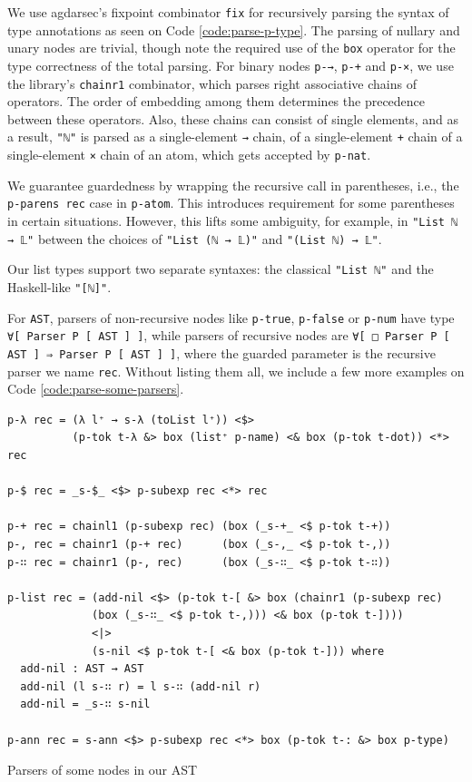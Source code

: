We use agdarsec's fixpoint combinator \verb$fix$ for recursively parsing the syntax of type annotations as seen on Code \ref{code:parse-p-type}. The parsing of nullary and unary nodes are trivial, though note the required use of the \verb$box$ operator for the type correctness of the total parsing. For binary nodes \verb$p-→$, \verb$p-+$ and \verb$p-×$, we use the library's \verb$chainr1$ combinator, which parses right associative chains of operators. The order of embedding among them determines the precedence between these operators. Also, these chains can consist of single elements, and as a result, \verb$"ℕ"$ is parsed as a single-element \verb$→$ chain, of a single-element \verb$+$ chain of a single-element \verb$×$ chain of an atom, which gets accepted by \verb$p-nat$.

We guarantee guardedness by wrapping the recursive call in parentheses, i.e., the \verb$p-parens rec$ case in \verb$p-atom$. This introduces requirement for some parentheses in certain situations. However, this lifts some ambiguity, for example, in \verb$"List ℕ → 𝕃"$ between the choices of \verb$"List (ℕ → 𝕃)"$ and \verb$"(List ℕ) → 𝕃"$.

Our list types support two separate syntaxes: the classical \verb$"List ℕ"$ and the Haskell-like \verb$"[ℕ]"$.

For \verb$AST$, parsers of non-recursive nodes like \verb$p-true$, \verb$p-false$ or \verb$p-num$ have type \verb$∀[ Parser P [ AST ] ]$, while parsers of recursive nodes are \verb$∀[ □ Parser P [ AST ] ⇒ Parser P [ AST ] ]$, where the guarded parameter is the recursive parser we name \verb$rec$. Without listing them all, we include a few more examples on Code \ref{code:parse-some-parsers}.

\begin{listing}[H]
\begin{verbatim}
p-λ rec = (λ l⁺ → s-λ (toList l⁺)) <$>
          (p-tok t-λ &> box (list⁺ p-name) <& box (p-tok t-dot)) <*> rec

p-$ rec = _s-$_ <$> p-subexp rec <*> rec

p-+ rec = chainl1 (p-subexp rec) (box (_s-+_ <$ p-tok t-+))
p-, rec = chainr1 (p-+ rec)      (box (_s-,_ <$ p-tok t-,))
p-∷ rec = chainr1 (p-, rec)      (box (_s-∷_ <$ p-tok t-∷))

p-list rec = (add-nil <$> (p-tok t-[ &> box (chainr1 (p-subexp rec)
             (box (_s-∷_ <$ p-tok t-,))) <& box (p-tok t-])))
             <|>
             (s-nil <$ p-tok t-[ <& box (p-tok t-])) where
  add-nil : AST → AST
  add-nil (l s-∷ r) = l s-∷ (add-nil r)
  add-nil = _s-∷ s-nil

p-ann rec = s-ann <$> p-subexp rec <*> box (p-tok t-: &> box p-type)
\end{verbatim}
\caption{Parsers of some nodes in our AST}
\label{code:parse-some-parsers}
\end{listing}

